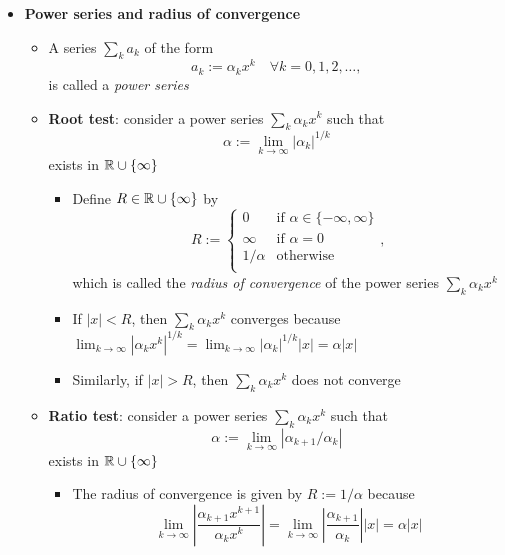 \documentclass[12pt,a4paper]{article}
\begin{document}
\begin{itemize}
\item \textbf{Power series and radius of convergence}
  \begin{itemize}
  \item A series $\sum_{k}a_{k}$ of the form
    \begin{equation}\nonumber%
      a_{k}:= \alpha_{k}x^{k} \quad \forall k = 0, 1, 2, \ldots,
    \end{equation}
    is called a \emph{power series}
  \item \textbf{Root test}: consider a power series $\sum_{k}\alpha_{k}x^{k}$ such that
    \begin{equation}\nonumber%
      \alpha := \lim_{k\to\infty}|\alpha_{k}|^{1/k}
    \end{equation}
    exists in $\mathbb{R}\cup\{\infty\}$
    \begin{itemize}
    \item Define $R\in \mathbb{R}\cup\{\infty\}$ by
      \begin{equation}\nonumber%
        R :=
        \begin{cases}
          0 & \text{if $\alpha\in \{-\infty, \infty\}$} \\
          \infty & \text{if $\alpha = 0$} \\
          1/\alpha & \text{otherwise} \\
        \end{cases},
      \end{equation}
      which is called the \emph{radius of convergence} of the power series $\sum_{k}\alpha_{k}x^{k}$
    \item If $|x|<R$, then $\sum_{k}\alpha_{k}x^{k}$ converges because
      $\lim_{k\to\infty}|\alpha_{k}x^{k}|^{1/k} = \lim_{k\to\infty}|\alpha_{k}|^{1/k}|x|= \alpha|x|$
    \item Similarly, if $|x|>R$, then $\sum_{k}\alpha_{k}x^{k}$ does not converge
    \end{itemize}
  \item \textbf{Ratio test}: consider a power series $\sum_{k}\alpha_{k}x^{k}$ such that
    \begin{equation}\nonumber%
      \alpha := \lim_{k\to\infty}|\alpha_{k+1}/\alpha_{k}|
    \end{equation}
    exists in $\mathbb{R}\cup\{\infty\}$
    \begin{itemize}
    \item The radius of convergence is given by $R:=1/\alpha$ because
      \begin{equation}\nonumber%
        \lim_{k\to\infty}\left| \frac{\alpha_{k+1}x^{k+1}}{\alpha_{k}x^{k}}\right|
        =
        \lim_{k\to\infty}\left| \frac{\alpha_{k+1}}{\alpha_{k}}\right||x|
        =
        \alpha|x|
      \end{equation}
    \end{itemize}
  \end{itemize}


\end{itemize}
\end{document}
